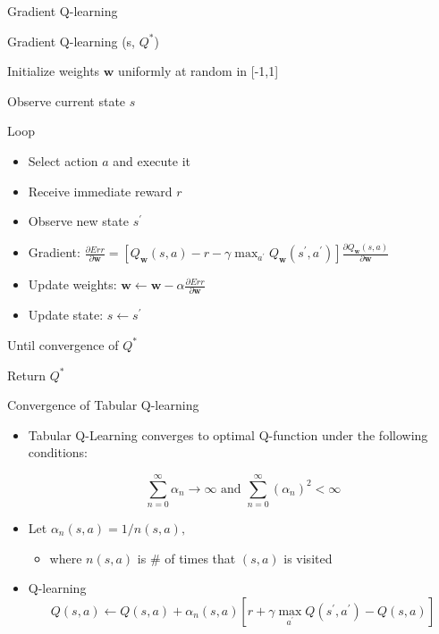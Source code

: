 \documentclass[11pt,table]{beamer}
\begin{document}
\begin{frame}{Gradient Q-learning}

\begin{tcolorbox}[colframe=black, boxrule=1pt, sharp corners]

\textcolor{red1}{Gradient Q-learning (s, $Q^{*}$)}

 Initialize weights $\boldsymbol{w}$ uniformly at random in [-1,1]
    
Observe current state $s$

Loop

\begin{itemize}
    \item[]  Select action $a$ and execute it
    \item[] Receive immediate reward $r$
    \item[] Observe new state $s^{\prime}$
    \item[] Gradient: $\frac{\partial E r r}{\partial \boldsymbol{w}}=\left[Q_{\boldsymbol{w}}(s, a)-r-\gamma \max _{a^{\prime}} Q_{\boldsymbol{w}}\left(s^{\prime}, a^{\prime}\right)\right] \frac{\partial Q_{\boldsymbol{w}}(s, a)}{\partial \boldsymbol{w}}$
    \item[] Update weights: $\boldsymbol{w} \leftarrow \boldsymbol{w}-\alpha \frac{\partial E r r}{\partial \boldsymbol{w}}$
    \item[] Update state: $s \leftarrow s^{\prime}$
\end{itemize}
Until convergence of $Q^{*}$

Return $Q^{*}$

\end{tcolorbox}
			
\end{frame}

\begin{frame}{Convergence of Tabular Q-learning}


   \begin{itemize}
       \item  Tabular Q-Learning converges to optimal Q-function under the following conditions:

$$
\sum_{n=0}^{\infty} \alpha_{n}\rightarrow\infty \text { and } \sum_{n=0}^{\infty}\left(\alpha_{n}\right)^{2}<\infty
$$

\item Let $\alpha_{n}(s, a)=1 / n(s, a),$

\begin{itemize}
    \item  where $n(s, a)$ is \# of times that $(s, a)$ is visited\\[2ex]
\end{itemize}
\item  Q-learning
$$Q(s, a) \leftarrow Q(s, a)+\alpha_{n}(s, a)\left[r+\gamma \max _{a^{\prime}} Q\left(s^{\prime}, a^{\prime}\right)-Q(s, a)\right]$$ 
   \end{itemize} 
\end{frame}
\end{document}
